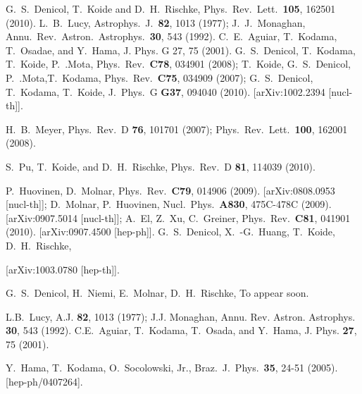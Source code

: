 \documentclass[aps,article]{revtex4}
\begin{document}
\begin{thebibliography}{99}
  G.~S.~Denicol, T.~Koide and D.~H.~Rischke,
  Phys.\ Rev.\ Lett.\  {\bf 105}, 162501 (2010).
 L.~B.~Lucy, Astrophys.\ J.\ {\bf 82}, 1013 (1977); J.~J.~Monaghan, Annu.\ Rev.\ Astron.\ Astrophys.\ {\bf 30}, 543 (1992).
C.~E.~Aguiar, T.~Kodama, T.~Osadae, and Y.~Hama, J. Phys. G 27, 75 (2001).
G.~S.~Denicol, T.~Kodama, T.~Koide, P.~.Mota,
  Phys.\ Rev.\  {\bf C78}, 034901 (2008); 
T.~Koide, G.~S.~Denicol, P.~.Mota,T.~Kodama,  
  Phys.\ Rev.\  {\bf C75}, 034909 (2007); 
  G.~S.~Denicol, T.~Kodama, T.~Koide,
  J.\ Phys.\ G {\bf G37}, 094040 (2010).
  [arXiv:1002.2394 [nucl-th]].




  H.~B.~Meyer,
  Phys.\ Rev.\  D {\bf 76}, 101701 (2007); 
  Phys.\ Rev.\ Lett.\  {\bf 100}, 162001 (2008).

 S.~Pu, T.~Koide, and D.~H.~Rischke, Phys.\ Rev.\ D {\bf 81}, 114039 (2010).


  P.~Huovinen, D.~Molnar,
  Phys.\ Rev.\  {\bf C79}, 014906 (2009).
  [arXiv:0808.0953 [nucl-th]]; D.~Molnar, P.~Huovinen,
  Nucl.\ Phys.\  {\bf A830}, 475C-478C (2009).
  [arXiv:0907.5014 [nucl-th]]; A.~El, Z.~Xu, C.~Greiner,
  Phys.\ Rev.\  {\bf C81}, 041901 (2010).
  [arXiv:0907.4500 [hep-ph]].
  G.~S.~Denicol, X.~-G.~Huang, T.~Koide, D.~H.~Rischke,
  
  [arXiv:1003.0780 [hep-th]].

G.~S.~Denicol, H.~Niemi, E.~Molnar, D.~H.~Rischke, To appear soon. 

L.B.~Lucy, A.J. {\bf 82}, 1013 (1977); J.J. Monaghan, Annu. Rev. Astron. Astrophys. {\bf 30}, 543 (1992).
C.E.~Aguiar, T.~Kodama, T.~Osada, and Y.~Hama, J. Phys. {\bf 27}, 75 (2001).

  Y.~Hama, T.~Kodama, O.~Socolowski, Jr.,
  Braz.\ J.\ Phys.\  {\bf 35}, 24-51 (2005).
  [hep-ph/0407264].


\end{thebibliography}
\end{document}
